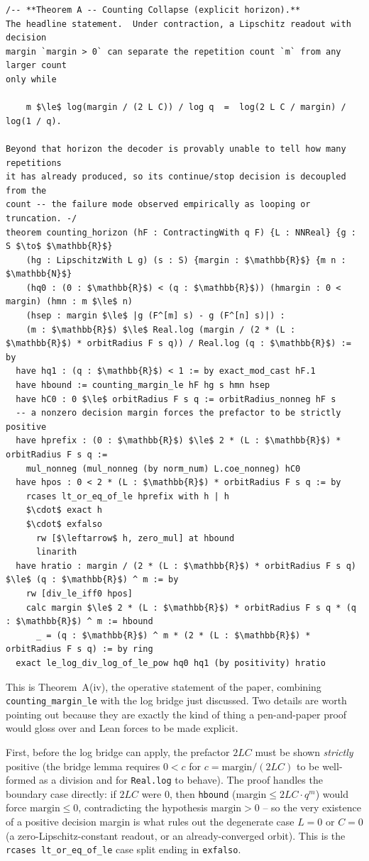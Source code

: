 \documentclass[11pt]{article}
\begin{document}
\begin{lstlisting}
/-- **Theorem A -- Counting Collapse (explicit horizon).**
The headline statement.  Under contraction, a Lipschitz readout with decision
margin `margin > 0` can separate the repetition count `m` from any larger count
only while

    m $\le$ log(margin / (2 L C)) / log q  =  log(2 L C / margin) / log(1 / q).

Beyond that horizon the decoder is provably unable to tell how many repetitions
it has already produced, so its continue/stop decision is decoupled from the
count -- the failure mode observed empirically as looping or truncation. -/
theorem counting_horizon (hF : ContractingWith q F) {L : NNReal} {g : S $\to$ $\mathbb{R}$}
    (hg : LipschitzWith L g) (s : S) {margin : $\mathbb{R}$} {m n : $\mathbb{N}$}
    (hq0 : (0 : $\mathbb{R}$) < (q : $\mathbb{R}$)) (hmargin : 0 < margin) (hmn : m $\le$ n)
    (hsep : margin $\le$ |g (F^[m] s) - g (F^[n] s)|) :
    (m : $\mathbb{R}$) $\le$ Real.log (margin / (2 * (L : $\mathbb{R}$) * orbitRadius F s q)) / Real.log (q : $\mathbb{R}$) := by
  have hq1 : (q : $\mathbb{R}$) < 1 := by exact_mod_cast hF.1
  have hbound := counting_margin_le hF hg s hmn hsep
  have hC0 : 0 $\le$ orbitRadius F s q := orbitRadius_nonneg hF s
  -- a nonzero decision margin forces the prefactor to be strictly positive
  have hprefix : (0 : $\mathbb{R}$) $\le$ 2 * (L : $\mathbb{R}$) * orbitRadius F s q :=
    mul_nonneg (mul_nonneg (by norm_num) L.coe_nonneg) hC0
  have hpos : 0 < 2 * (L : $\mathbb{R}$) * orbitRadius F s q := by
    rcases lt_or_eq_of_le hprefix with h | h
    $\cdot$ exact h
    $\cdot$ exfalso
      rw [$\leftarrow$ h, zero_mul] at hbound
      linarith
  have hratio : margin / (2 * (L : $\mathbb{R}$) * orbitRadius F s q) $\le$ (q : $\mathbb{R}$) ^ m := by
    rw [div_le_iff0 hpos]
    calc margin $\le$ 2 * (L : $\mathbb{R}$) * orbitRadius F s q * (q : $\mathbb{R}$) ^ m := hbound
      _ = (q : $\mathbb{R}$) ^ m * (2 * (L : $\mathbb{R}$) * orbitRadius F s q) := by ring
  exact le_log_div_log_of_le_pow hq0 hq1 (by positivity) hratio
\end{lstlisting}

This is Theorem~A(iv), the operative statement of the paper, combining
\texttt{counting\_margin\_le} with the log bridge just discussed. Two details
are worth pointing out because they are exactly the kind of thing a
pen-and-paper proof would gloss over and Lean forces to be made explicit.

First, before the log bridge can apply, the prefactor $2LC$ must be shown
\emph{strictly} positive (the bridge lemma requires $0<c$ for
$c=\text{margin}/(2LC)$ to be well-formed as a division and for
\texttt{Real.log} to behave). The proof handles the boundary case directly:
if $2LC$ were $0$, then \texttt{hbound} ($\text{margin}\le 2LC\cdot q^m$)
would force $\text{margin}\le 0$, contradicting the hypothesis
$\text{margin}>0$ -- so the very existence of a positive decision margin is
what rules out the degenerate case $L=0$ or $C=0$ (a zero-Lipschitz-constant
readout, or an already-converged orbit). This is the \texttt{rcases
lt\_or\_eq\_of\_le} case split ending in \texttt{exfalso}.
\end{document}

